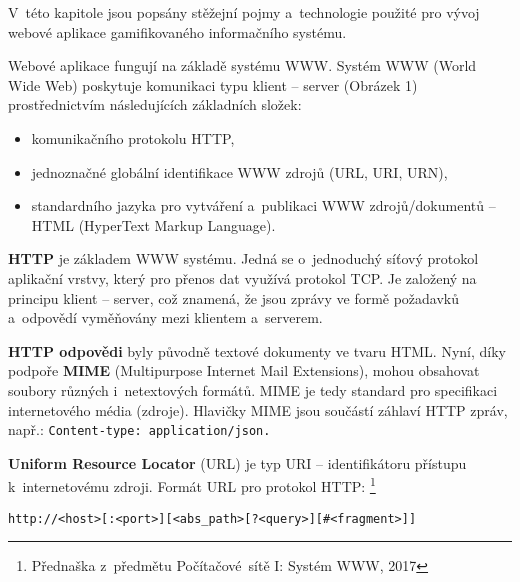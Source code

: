 \documentclass[12pt]{article}
\begin{document}
\par


V~této kapitole jsou popsány stěžejní pojmy a~technologie použité pro vývoj webové aplikace
gamifikovaného informačního systému.

Webové aplikace fungují na základě systému WWW. 
Systém WWW (World Wide Web) poskytuje komunikaci typu klient -- server (Obrázek 1)
prostřednictvím následujících základních složek:

\begin{itemize}
\item komunikačního protokolu HTTP, 
\item jednoznačné globální identifikace WWW zdrojů (URL, URI, URN),
\item standardního jazyka pro vytváření a~publikaci WWW zdrojů/dokumentů -- HTML
(HyperText Markup Language).
\end{itemize}

\obrazek
{}

\textbf{HTTP} je základem  WWW systému. 
Jedná se o~jednoduchý síťový protokol aplikační vrstvy, 
který pro přenos dat využívá protokol TCP. 
Je založený na principu klient -- server, 
což znamená, že jsou zprávy ve formě požadavků a~odpovědí vyměňovány mezi klientem 
a~serverem. 

\textbf{HTTP odpovědi} byly původně textové dokumenty ve tvaru HTML.
Nyní, díky podpoře \textbf{MIME} (Multipurpose Internet Mail Extensions),
mohou obsahovat soubory různých i~netextových formátů.
MIME je tedy standard pro specifikaci internetového média (zdroje).
Hlavičky MIME jsou součástí záhlaví HTTP zpráv, např.: \texttt{Content-type:~application/json.} 

\textbf{Uniform Resource Locator} (URL) je typ URI -- identifikátoru přístupu k~internetovému zdroji.
Formát URL pro protokol HTTP:
\footnote{Přednaška z~předmětu Počítačové~sítě I: Systém WWW, 2017}

\bigskip
\texttt{http://<host>[:<port>][<abs\_path>[?<query>][\#<fragment>]]}

\bigskip
\end{document}
